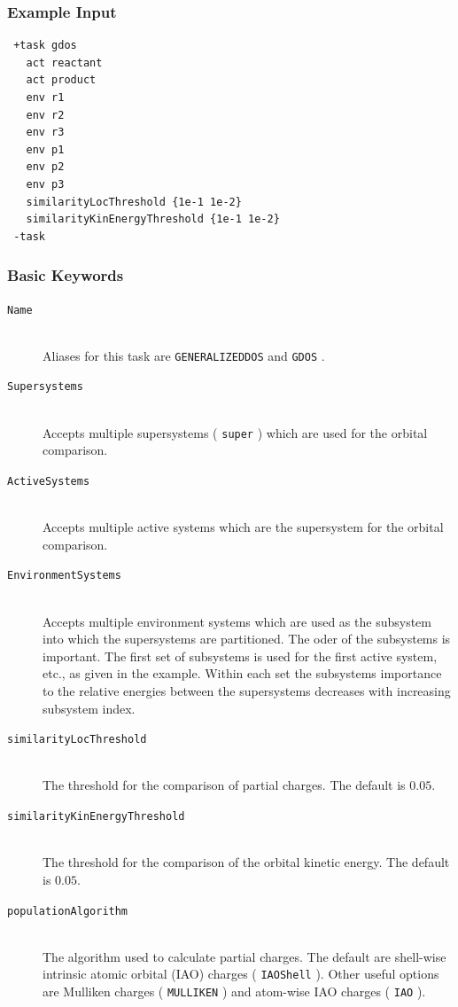 \documentclass[bibliography=totocnumbered,a4paper,10pt,oneside]{scrbook}
\newcommand{\ttt}[1]{%
  \begingroup\setlength{\fboxsep}{1pt}%
  \colorbox{serenity-green!30}{\texttt{\hspace*{2pt}\vphantom{(g}#1\hspace*{2pt}}}%
  \endgroup
}
\begin{document}
\subsubsection{Example Input}
\begin{lstlisting}
 +task gdos
   act reactant
   act product
   env r1
   env r2
   env r3
   env p1
   env p2
   env p3
   similarityLocThreshold {1e-1 1e-2}
   similarityKinEnergyThreshold {1e-1 1e-2}
 -task
\end{lstlisting}
\subsubsection{Basic Keywords}
\begin{description}
 \item [\texttt{Name}]\hfill \\
 Aliases for this task are \ttt{GENERALIZEDDOS} and \ttt{GDOS}.
 \item [\texttt{Supersystems}]\hfill \\
 Accepts multiple supersystems (\ttt{super}) which are used for the orbital comparison.
 \item [\texttt{ActiveSystems}]\hfill \\
 Accepts multiple active systems which are the supersystem for the orbital comparison.
 \item [\texttt{EnvironmentSystems}]\hfill \\
 Accepts multiple environment systems which are used as the subsystem into which the
 supersystems are partitioned. The oder of the subsystems is important. The
 first set of subsystems is used for the first active system, etc., as given in the
 example. Within each set the subsystems importance to the relative energies between
 the supersystems decreases with increasing subsystem index.
 \item [\texttt{similarityLocThreshold}]\hfill \\
 The threshold for the comparison of partial charges. The default is ${0.05}$.
 \item [\texttt{similarityKinEnergyThreshold}]\hfill \\
 The threshold for the comparison of the orbital kinetic energy. The default is ${0.05}$.
 \item [\texttt{populationAlgorithm}]\hfill \\
 The algorithm used to calculate partial charges. The default are shell-wise intrinsic atomic orbital (IAO)
 charges (\ttt{IAOShell}). Other useful options are Mulliken charges (\ttt{MULLIKEN}) and atom-wise IAO
 charges (\ttt{IAO}).
\end{description}
\end{document}
